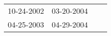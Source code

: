 \begin{supertabular}{llll}
 10-24-2002 &  03-20-2004 \\
 04-25-2003 &  04-29-2004 \\
\end{supertabular}
